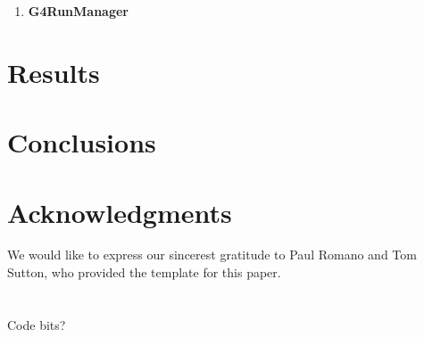 \documentclass{mc2015}
\begin{document}
\begin{enumerate}
\item \textbf{G4RunManager}
\end{enumerate}

\section{Results}

\lipsum[7-10]

\section{Conclusions}

\lipsum[11-15]

\section{Acknowledgments}

We would like to express our sincerest gratitude to Paul Romano and Tom Sutton, who provided the template for this paper.

\setlength{\baselineskip}{12pt}




\appendix
\section{}

Code bits?
\end{document}
